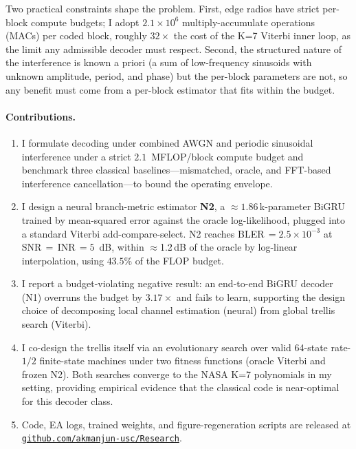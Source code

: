 \documentclass[conference]{IEEEtran}
\begin{document}
Two practical constraints shape the problem.  First, edge radios have
strict per-block compute budgets; I adopt $2.1\times10^{6}$
multiply-accumulate operations (MACs) per coded block, roughly
$32\times$ the cost of the K=7 Viterbi inner loop, as the limit any
admissible decoder must respect.  Second, the structured nature of the
interference is known a priori (a sum of low-frequency sinusoids with
unknown amplitude, period, and phase) but the per-block parameters are
not, so any benefit must come from a per-block estimator that fits within
the budget.

\paragraph*{Contributions.}
\begin{enumerate}
  \item I formulate decoding under combined AWGN and periodic sinusoidal
    interference under a strict $2.1$~MFLOP/block compute budget and
    benchmark three classical baselines---mismatched, oracle, and
    FFT-based interference cancellation---to bound the operating envelope.
  \item I design a neural branch-metric estimator \textbf{N2}, a
    $\approx 1.86$\,k-parameter BiGRU trained by mean-squared error
    against the oracle log-likelihood, plugged into a standard Viterbi
    add-compare-select.  N2 reaches BLER\,$=2.5{\times}10^{-3}$ at
    SNR\,$=$\,INR\,$=5$~dB, within $\approx$1.2\,dB of the oracle by
    log-linear interpolation, using $43.5\%$ of the FLOP budget.
  \item I report a budget-violating negative result: an end-to-end
    BiGRU decoder (N1) overruns the budget by $3.17\times$ and fails to
    learn, supporting the design choice of decomposing local channel
    estimation (neural) from global trellis search (Viterbi).
  \item I co-design the trellis itself via an evolutionary search over
    valid 64-state rate-$1/2$ finite-state machines under two fitness
    functions (oracle Viterbi and frozen N2).  Both searches converge to
    the NASA K=7 polynomials in my setting, providing empirical evidence
    that the classical code is near-optimal for this decoder class.
  \item Code, EA logs, trained weights, and figure-regeneration scripts
    are released at
    \href{https://github.com/akmanjun-usc/Research}{\texttt{github.com/akmanjun-usc/Research}}.
\end{enumerate}
\end{document}
